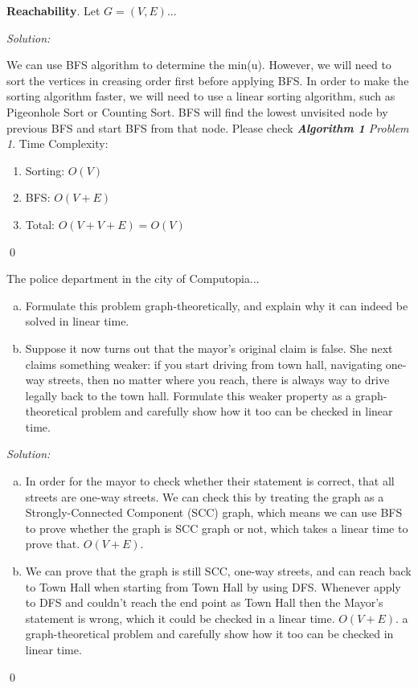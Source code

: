 \documentclass[12pt]{article}
\newenvironment{problem}[2][Problem]{\begin{trivlist}
\item[\hskip \labelsep {\bfseries #1}\hskip \labelsep {\bfseries #2.}]}{\end{trivlist}}
\newenvironment{sol}
    {\emph{Solution:}
    }
    {
    \qed
    }
\begin{document}
\begin{problem}{1} \textbf{Reachability}. Let $G = (V, E)$...
\end{problem}
\begin{sol}
We can use BFS algorithm to determine the min(u). However, we will need to sort the vertices in creasing order first before applying BFS. In order to make the sorting algorithm faster, we will need to use a linear sorting algorithm, such as Pigeonhole Sort or Counting Sort. BFS will find the lowest unvisited node by previous BFS and start BFS from that node. Please check \textit{\textbf{Algorithm 1} Problem 1}. Time Complexity:
\begin{enumerate}
    \item Sorting: $O(V)$
    \item BFS: $O(V+E)$
    \item Total: $O(V+V+E)=O(V)$
\end{enumerate}

\end{sol}

\begin{problem}{2} The police department in the city of Computopia...
\begin{enumerate}[(a)]
    \item Formulate this problem graph-theoretically, and explain why it can indeed be solved in linear time.
    \item  Suppose it now turns out that the mayor’s original claim is false. She next claims something weaker: if you start driving from town hall, navigating one-way streets, then no matter where you reach, there is always way to drive legally back to the town hall. Formulate this weaker property as a graph-theoretical problem and carefully show how it too can be checked in linear time.
\end{enumerate}
\end{problem}
\begin{sol}
\begin{enumerate}[(a)]
    \item In order for the mayor to check whether their statement is correct, that all streets are one-way streets. We can check this by treating the graph as a Strongly-Connected Component (SCC) graph, which means we can use BFS to prove whether the graph is SCC graph or not, which takes a linear time to prove that. $O(V+E)$.
    \item  We can prove that the graph is still SCC, one-way streets, and can reach back to Town Hall when starting from Town Hall by using DFS. Whenever apply to DFS and couldn't reach the end point as Town Hall then the Mayor's statement is wrong, which it could be checked in a linear time. $O(V+E)$.
a graph-theoretical problem and carefully show how it too can be checked in linear time.
\end{enumerate}
\end{sol}
\end{document}
